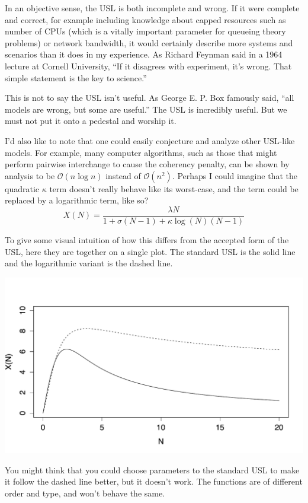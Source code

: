 \documentclass{vivid_layout}
\begin{document}
In an objective sense, the USL is both incomplete and wrong.  If it were
complete and correct, for example including knowledge about capped resources
such as number of CPUs (which is a vitally important parameter for queueing
theory problems) or network bandwidth, it would certainly describe more systems
and scenarios than it does in my experience. As Richard Feynman said in a 1964
lecture at Cornell University, ``If it disagrees with experiment, it’s wrong.
That simple statement is the key to science.''

This is not to say the USL isn't useful. As George E. P. Box famously said,
``all models are wrong, but some are useful.'' The USL is incredibly useful. But
we must not put it onto a pedestal and worship it.  

I'd also like to note that one could easily conjecture and analyze other
USL-like models. For example, many computer algorithms, such as those
that might perform pairwise interchange to cause the coherency penalty, can be shown
by analysis to be $\mathcal{O}(n\log{}n)$ instead of $\mathcal{O}(n^2)$. Perhaps
I could imagine that the quadratic $\kappa$ term doesn't really behave like its
worst-case, and the term could be replaced by a logarithmic term, like so?
\begin{equation}
X(N) = \frac{\lambda N}{1 + \sigma(N-1) + \kappa \log(N)(N-1)}
\label{usl_log}
\end{equation}

To give some visual intuition of how this differs from the accepted form of the
USL, here they are together on a single plot. The standard USL is the solid line
and the logarithmic variant is the dashed line.
\begin{center}
\includegraphics[width=.85\linewidth]{scalability/logscale}
\end{center}

You might think that you could choose parameters to the standard USL to make it
follow the dashed line better, but it doesn't work. The functions are of
different order and type, and won't behave the same.
\end{document}

